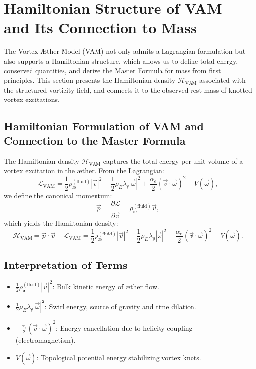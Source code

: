 \section{Hamiltonian Structure of VAM and Its Connection to Mass}

The Vortex \AE ther Model (VAM) not only admits a Lagrangian formulation but also supports a Hamiltonian structure, which allows us to define total energy, conserved quantities, and derive the Master Formula for mass from first principles. This section presents the Hamiltonian density \( \mathcal{H}_\text{VAM} \) associated with the structured vorticity field, and connects it to the observed rest mass of knotted vortex excitations.

\subsection{Hamiltonian Formulation of VAM and Connection to the Master Formula}

The Hamiltonian density \( \mathcal{H}_\text{VAM} \) captures the total energy per unit volume of a vortex excitation in the æther. From the Lagrangian:
\begin{equation}
\mathcal{L}_\text{VAM} =
\frac{1}{2} \rho_\text{\ae}^{(\text{fluid})} |\vec{v}|^2
- \frac{1}{2} \rho_{\scriptscriptstyle\boldsymbol\!E}\lambda_g |\vec{\omega}|^2
+ \frac{\alpha_e}{2} (\vec{v} \cdot \vec{\omega})^2
- V(\vec{\omega}),
\end{equation}
we define the canonical momentum:
\begin{equation}
\vec{p} = \frac{\partial \mathcal{L}}{\partial \dot{\vec{v}}} = \rho_\text{\ae}^{(\text{fluid})} \vec{v},
\end{equation}
which yields the Hamiltonian density:
\begin{equation}
\mathcal{H}_\text{VAM} = \vec{p} \cdot \vec{v} - \mathcal{L}_\text{VAM}
= \frac{1}{2} \rho_\text{\ae}^{(\text{fluid})} |\vec{v}|^2
+ \frac{1}{2} \rho_{\scriptscriptstyle\boldsymbol\!E}\lambda_g |\vec{\omega}|^2
- \frac{\alpha_e}{2} (\vec{v} \cdot \vec{\omega})^2
+ V(\vec{\omega}).
\end{equation}

\subsection*{Interpretation of Terms}
\begin{itemize}
    \item \( \frac{1}{2} \rho_\text{\ae}^{(\text{fluid})} |\vec{v}|^2 \): Bulk kinetic energy of æther flow.
    \item \( \frac{1}{2} \rho_{\scriptscriptstyle\boldsymbol\!E}\lambda_g |\vec{\omega}|^2 \): Swirl energy, source of gravity and time dilation.
    \item \( -\frac{\alpha_e}{2} (\vec{v} \cdot \vec{\omega})^2 \): Energy cancellation due to helicity coupling (electromagnetism).
    \item \( V(\vec{\omega}) \): Topological potential energy stabilizing vortex knots.
\end{itemize}

